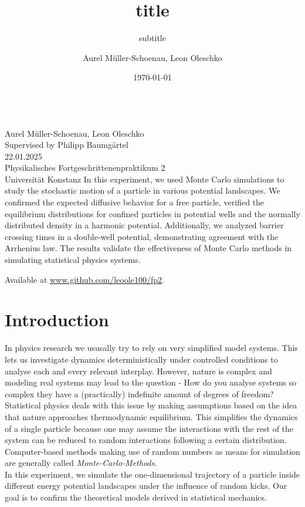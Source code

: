 \documentclass[
    parskip=half, 
    twoside=false,
    twocolumn=true,
    fontsize=11pt,
]{scrarticle}
\begin{document}
\title{title}
\subtitle{subtitle}
\author{Aurel Müller-Schoenau, Leon Oleschko}
\date{\dotdate\today}


\begin{titlepage}
    \sffamily
    \vspace*{3cm}
    {
        \fontsize{32}{32}
    }
    \vspace{.25cm}\\
    {
        \Large
        Aurel Müller-Schoenau, Leon Oleschko\\
        Supervised by Philipp Baumgärtel
        \vspace{.05cm}\\
        22.01.2025
        \vspace{.25cm}\\
        \normalsize
        Physikalisches Fortgeschrittenenpraktikum 2\\
        Universität Konstanz
    }
    \vfill
    {
        \normalfont\normalsize
        In this experiment, we used Monte Carlo simulations to study the stochastic motion of a particle in various potential landscapes. We confirmed the expected diffusive behavior for a free particle, verified the equilibrium distributions for confined particles in potential wells and the normally distributed density in a harmonic potential. Additionally, we analyzed barrier crossing times in a double-well potential, demonstrating agreement with the Arrhenius law. The results validate the effectiveness of Monte Carlo methods in simulating statistical physics systems.
    }
    \vfill
    \begin{flushright}
        Available at \url{www.github.com/leoole100/fp2}.
    \end{flushright}
\end{titlepage}

\section{Introduction}
In physics research we ususally try to rely on very simplified model systems. This lets us investigate dynamics deterministically under controlled conditions to analyse each and every relevant interplay. However, nature is complex and modeling real systems may lead to the question - How do you analyse systems so complex they have a (practically) indefinite amount of degrees of freedom?\\
Statistical physics deals with this issue by making assumptions based on the idea that nature approaches thermodynamic equilibrium. This simplifies the dynamics of a single particle because one may assume the interactions with the rest of the system can be reduced to random interactions following a certain distribution. Computer-based methods making use of random numbers as means for simulation are generally called \textit{Monte-Carlo-Methods}.\\
In this experiment, we simulate the one-dimensional trajectory of a particle inside different energy potential landscapes under the influence of random kicks. Our goal is to confirm the theoretical models derived in statistical mechanics.
\end{document}

